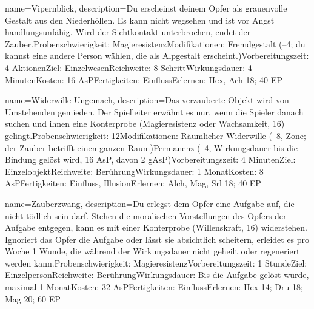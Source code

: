 {
    name={Vipernblick},
    description={Du erscheinst deinem Opfer als grauenvolle Gestalt aus den Niederhöllen. Es kann nicht wegsehen und ist vor Angst handlungsunfähig. Wird der Sichtkontakt unterbrochen, endet der Zauber.\newline Probenschwierigkeit: Magieresistenz\newline Modifikationen: Fremdgestalt (–4; du kannst eine andere Person wählen, die als Alpgestalt erscheint.)\newline Vorbereitungszeit: 4 Aktionen\newline Ziel: Einzelwesen\newline Reichweite: 8 Schritt\newline Wirkungsdauer: 4 Minuten\newline Kosten: 16 AsP\newline Fertigkeiten: Einfluss\newline Erlernen: Hex, Ach 18; 40 EP}
}


{
    name={Widerwille Ungemach},
    description={Das verzauberte Objekt wird von Umstehenden gemieden. Der Spielleiter erwähnt es nur, wenn die Spieler danach suchen und ihnen eine Konterprobe (Magieresistenz oder Wachsamkeit, 16) gelingt.\newline Probenschwierigkeit: 12\newline Modifikationen: Räumlicher Widerwille (–8, Zone; der Zauber betrifft einen ganzen Raum)\newline Permanenz (–4, Wirkungsdauer bis die Bindung gelöst wird, 16 AsP, davon 2 gAsP)\newline Vorbereitungszeit: 4 Minuten\newline Ziel: Einzelobjekt\newline Reichweite: Berührung\newline Wirkungsdauer: 1 Monat\newline Kosten: 8 AsP\newline Fertigkeiten: Einfluss, Illusion\newline Erlernen: Alch, Mag, Srl 18; 40 EP}
}


{
    name={Zauberzwang},
    description={Du erlegst dem Opfer eine Aufgabe auf, die nicht tödlich sein darf. Stehen die moralischen Vorstellungen des Opfers der Aufgabe entgegen, kann es mit einer Konterprobe (Willenskraft, 16) widerstehen. Ignoriert das Opfer die Aufgabe oder lässt sie absichtlich scheitern, erleidet es pro Woche 1 Wunde, die während der Wirkungsdauer nicht geheilt oder regeneriert werden kann.\newline Probenschwierigkeit: Magieresistenz\newline Vorbereitungszeit: 1 Stunde\newline Ziel: Einzelperson\newline Reichweite: Berührung\newline Wirkungsdauer: Bis die Aufgabe gelöst wurde, maximal 1 Monat\newline Kosten: 32 AsP\newline Fertigkeiten: Einfluss\newline Erlernen: Hex 14; Dru 18; Mag 20; 60 EP}
}


